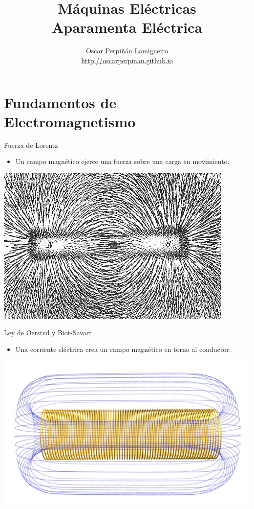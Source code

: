 \documentclass[xcolor={usenames,svgnames,dvipsnames}]{beamer}
\author{Oscar Perpiñán Lamigueiro \\ \url{http://oscarperpinan.github.io}}
\date{}
\title{Máquinas Eléctricas \\ Aparamenta Eléctrica}
\begin{document}
\maketitle

\section{Fundamentos de Electromagnetismo}
\label{sec:orgbc19b3c}


\begin{frame}[label={sec:org901177d}]{Fuerza de Lorentz}
\begin{itemize}
\item Un campo magnético ejerce una fuerza sobre una carga en movimiento.
\end{itemize}

\begin{center}
\includegraphics[width=.9\linewidth]{../figs/Magnet0873.png}
\end{center}
\end{frame}

\begin{frame}[label={sec:orgfb743b8}]{Ley de Oersted y Biot-Savart}
\begin{itemize}
\item Una corriente eléctrica crea un campo magnético en torno al
conductor.
\end{itemize}

\begin{center}
\includegraphics[width=.9\linewidth]{../figs/Solenoide.jpg}
\end{center}
\end{frame}
\end{document}
